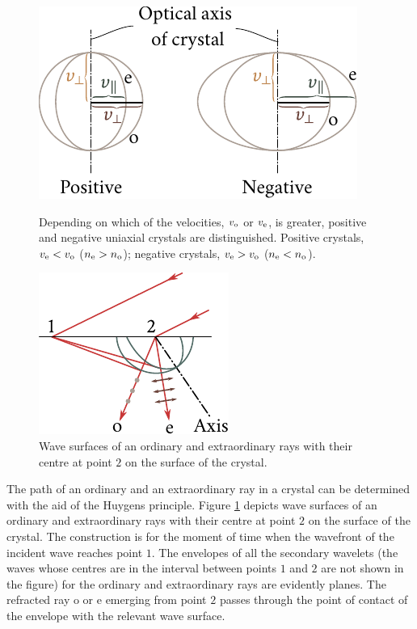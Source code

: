 \begin{figure}[t]
	\begin{minipage}[t]{0.56\linewidth}
		\begin{center}
			\includegraphics[scale=1]{figures/ch_19/fig_19_10.pdf}
            \caption[]{Depending on which of the velocities, $v_{\text{o}}$ or $v_{\text{e}}$, is greater, positive and negative uniaxial crystals are distinguished. Positive crystals, $v_{\text{e}}<v_{\text{o}}$ ($n_{\text{e}}>n_{\text{o}}$);
			negative crystals, $v_{\text{e}}>v_{\text{o}}$ ($n_{\text{e}}<n_{\text{o}}$).}
			\label{fig:19_10}
		\end{center}
	\end{minipage}
	\hfill{ }%
	\begin{minipage}[t]{0.4\linewidth}
		\begin{center}
			\includegraphics[scale=1]{figures/ch_19/fig_19_11.pdf}
			\caption[]{Wave surfaces of an ordinary and extraordinary rays with their centre at point $2$ on the surface of the crystal.}
			\label{fig:19_11}
		\end{center}
	\end{minipage}
\vspace{-0.4cm}
\end{figure}

The path of an ordinary and an extraordinary ray in a crystal can be determined with the aid of the Huygens principle.
Figure \ref{fig:19_11} depicts wave surfaces of an ordinary and extraordinary rays with their centre at point $2$ on the surface of the crystal.
The construction is for the moment of time when the wavefront of the incident wave reaches point $1$.
The envelopes of all the secondary wavelets (the waves whose centres are in the interval between points $1$ and $2$ are not shown in the figure) for the ordinary and extraordinary rays are evidently planes.
The refracted ray o or e emerging from point $2$ passes through the point of contact of the envelope with the relevant wave surface.

